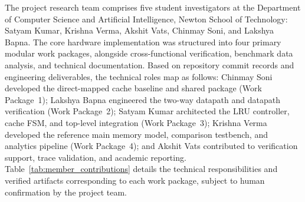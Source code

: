 \documentclass[conference]{IEEEtran}
\begin{document}
The project research team comprises five student investigators at the Department of Computer Science and Artificial Intelligence, Newton School of Technology: Satyam Kumar, Krishna Verma, Akshit Vats, Chinmay Soni, and Lakshya Bapna. The core hardware implementation was structured into four primary modular work packages, alongside cross-functional verification, benchmark data analysis, and technical documentation. Based on repository commit records and engineering deliverables, the technical roles map as follows: Chinmay Soni developed the direct-mapped cache baseline and shared package (Work Package~1); Lakshya Bapna engineered the two-way datapath and datapath verification (Work Package~2); Satyam Kumar architected the LRU controller, cache FSM, and top-level integration (Work Package~3); Krishna Verma developed the reference main memory model, comparison testbench, and analytics pipeline (Work Package~4); and Akshit Vats contributed to verification support, trace validation, and academic reporting. Table~\ref{tab:member_contributions} details the technical responsibilities and verified artifacts corresponding to each work package, subject to human confirmation by the project team.
\end{document}
